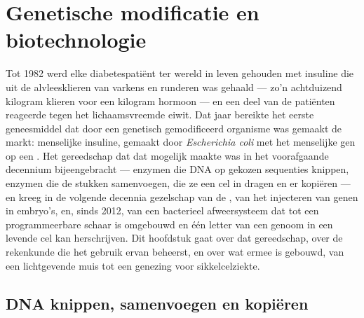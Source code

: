 \chapter{Genetische modificatie en biotechnologie}\label{ch:b3:genetic-engineering}

Tot 1982 werd elke diabetespatiënt ter wereld in leven gehouden met
insuline die uit de alvleesklieren van varkens en runderen was gehaald
--- zo'n achtduizend kilogram klieren voor een kilogram hormoon --- en
een deel van de patiënten reageerde tegen het lichaamsvreemde eiwit.
Dat jaar bereikte het eerste geneesmiddel dat door een genetisch
gemodificeerd organisme was gemaakt de markt: menselijke insuline,
gemaakt door \emph{Escherichia coli} met het menselijke gen op een
. Het gereedschap dat dat mogelijk maakte was in het
voorafgaande decennium bijeengebracht --- enzymen die DNA op gekozen
sequenties knippen, enzymen die de stukken samenvoegen,  die
ze een cel in dragen en er kopiëren --- en kreeg in de volgende
decennia gezelschap van de , van het injecteren
van genen in embryo's, en, sinds 2012, van een bacterieel afweersysteem
dat tot een programmeerbare schaar is omgebouwd en één letter van een
genoom in een levende cel kan herschrijven. Dit hoofdstuk gaat over dat
gereedschap, over de rekenkunde die het gebruik ervan beheerst, en over
wat ermee is gebouwd, van een lichtgevende muis tot een genezing voor
sikkelcelziekte.

\section{DNA knippen, samenvoegen en kopiëren}

